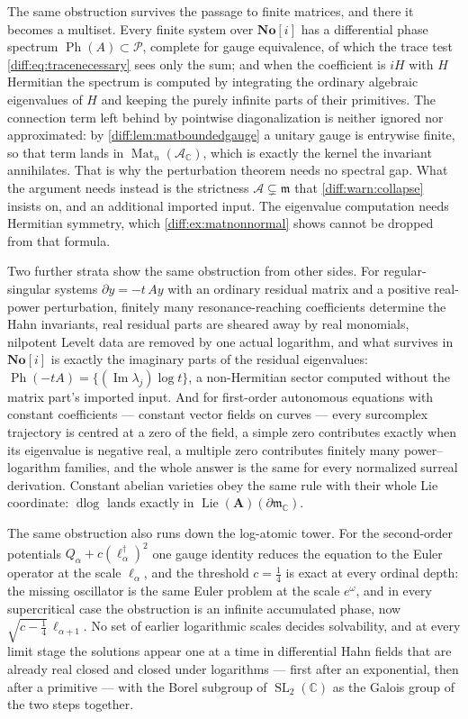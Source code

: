 \documentclass[11pt,letterpaper]{article}
\numberwithin{equation}{section}
\theoremstyle{definition}
\theoremstyle{remark}
\newcommand{\SC}{\mathbf{No}[i]}
\newcommand{\C}{\mathbb C}
\newcommand{\der}{\partial}
\newcommand{\mm}{\mathfrak m}
\newcommand{\Pcl}{\mathcal P}
\newcommand{\Acl}{\mathcal A}
\newcommand{\Imm}{\operatorname{Im}}
\newcommand{\Mat}{\operatorname{Mat}}
\newcommand{\SL}{\operatorname{SL}}
\newcommand{\Ph}{\operatorname{Ph}}
\newcommand{\Lie}{\operatorname{Lie}}
\newcommand{\dlog}{\operatorname{dlog}}
\begin{document}
The same obstruction survives the passage to finite matrices, and there it
becomes a multiset. Every finite system over $\SC$ has a differential phase
spectrum $\Ph(A)\subset\Pcl$, complete for gauge equivalence, of which the
trace test \cref{diff:eq:tracenecessary} sees only the sum; and when the
coefficient is $iH$ with $H$ Hermitian the spectrum is computed by integrating
the ordinary algebraic eigenvalues of $H$ and keeping the purely infinite parts
of their primitives. The connection term left behind by pointwise
diagonalization is neither ignored nor approximated: by
\cref{diff:lem:matboundedgauge} a unitary gauge is entrywise finite, so that
term lands in $\Mat_{n}(\Acl_{\C})$, which is exactly the kernel the invariant
annihilates. That is why the perturbation theorem needs no spectral gap. What
the argument needs instead is the strictness $\Acl\subsetneq\mm$ that
\cref{diff:warn:collapse} insists on, and an additional imported input.
The eigenvalue computation needs Hermitian symmetry, which
\cref{diff:ex:matnonnormal} shows cannot be dropped from that formula.

Two further strata show the same obstruction from other sides. For
regular-singular systems $\der y=-t\,Ay$ with an ordinary residual matrix and a
positive real-power perturbation, finitely many resonance-reaching coefficients
determine the Hahn invariants, real residual parts are sheared away by real
monomials, nilpotent Levelt data are removed by one actual logarithm, and what
survives in $\SC$ is exactly the imaginary parts of the residual eigenvalues:
$\Ph(-tA)=\{(\Imm\lambda_{j})\log t\}$, a non-Hermitian sector computed without
the matrix part's imported input. And for first-order autonomous equations with
constant coefficients --- constant vector fields on curves --- every surcomplex
trajectory is centred at a zero of the field, a simple zero contributes exactly
when its eigenvalue is negative real, a multiple zero contributes finitely many
power--logarithm families, and the whole answer is the same for every normalized
surreal derivation. Constant abelian varieties obey the same rule with their
whole Lie coordinate: $\dlog$ lands exactly in $\Lie(\mathbf A)(\der\mm_{\C})$.

The same obstruction also runs down the log-atomic tower. For the second-order
potentials $Q_{\alpha}+c(\ell_{\alpha}^{\dagger})^{2}$ one gauge identity
reduces the equation to the Euler operator at the scale $\ell_{\alpha}$, and
the threshold $c=\frac14$ is exact at every ordinal depth: the missing
oscillator is the same Euler problem at the scale $e^{\omega}$, and in every
supercritical case the obstruction is an infinite accumulated phase, now
$\sqrt{c-\frac14}\,\ell_{\alpha+1}$. No set of earlier logarithmic scales
decides solvability, and at every limit stage the solutions appear one at a
time in differential Hahn fields that are already real closed and closed under
logarithms --- first after an exponential, then after a primitive --- with the
Borel subgroup of $\SL_{2}(\C)$ as the Galois group of the two steps together.
\end{document}
